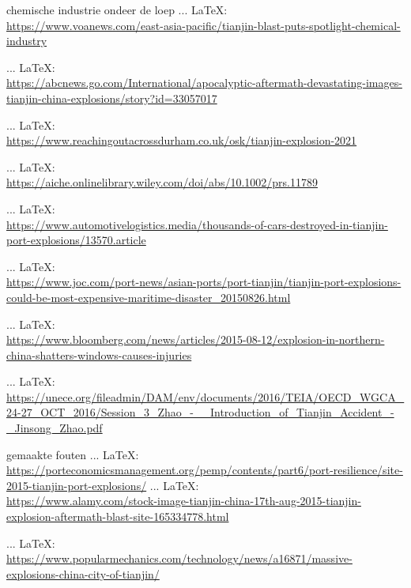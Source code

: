 \begin{thebibliography}{99}
{{{    chemische industrie ondeer de loep
     ... \LaTeX:\\ \url{https://www.voanews.com/east-asia-pacific/tianjin-blast-puts-spotlight-chemical-industry}

     ... \LaTeX:\\ \url{https://abcnews.go.com/International/apocalyptic-aftermath-devastating-images-tianjin-china-explosions/story?id=33057017}

     ... \LaTeX:\\ \url{https://www.reachingoutacrossdurham.co.uk/osk/tianjin-explosion-2021}

     ... \LaTeX:\\ \url{https://aiche.onlinelibrary.wiley.com/doi/abs/10.1002/prs.11789}
     
     ... \LaTeX:\\ \url{https://www.automotivelogistics.media/thousands-of-cars-destroyed-in-tianjin-port-explosions/13570.article}

     ... \LaTeX:\\ \url{https://www.joc.com/port-news/asian-ports/port-tianjin/tianjin-port-explosions-could-be-most-expensive-maritime-disaster_20150826.html}

     ... \LaTeX:\\ \url{https://www.bloomberg.com/news/articles/2015-08-12/explosion-in-northern-china-shatters-windows-causes-injuries}

     ... \LaTeX:\\ \url{https://unece.org/fileadmin/DAM/env/documents/2016/TEIA/OECD_WGCA_24-27_OCT_2016/Session_3_Zhao_-__Introduction_of_Tianjin_Accident_-_Jinsong_Zhao.pdf}

    gemaakte fouten
     ... \LaTeX:\\ \url{https://porteconomicsmanagement.org/pemp/contents/part6/port-resilience/site-2015-tianjin-port-explosions/}
     ... \LaTeX:\\ \url{https://www.alamy.com/stock-image-tianjin-china-17th-aug-2015-tianjin-explosion-aftermath-blast-site-165334778.html}

     ... \LaTeX:\\ \url{https://www.popularmechanics.com/technology/news/a16871/massive-explosions-china-city-of-tianjin/}

}}}
\end{thebibliography}
